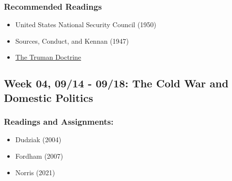 \documentclass[
  letterpaper,
  DIV=11,
  numbers=noendperiod]{scrartcl}
\providecommand{\tightlist}{%
  \setlength{\itemsep}{0pt}\setlength{\parskip}{0pt}}
\begin{document}
\subsubsection{Recommended Readings}\label{recommended-readings}

\begin{itemize}
\tightlist
\item
  United States National Security Council (1950)
\item
  Sources, Conduct, and Kennan (1947)
\item
  \href{https://www.archives.gov/milestone-documents/truman-doctrine}{The
  Truman Doctrine}
\end{itemize}

\subsection{Week 04, 09/14 - 09/18: The Cold War and Domestic
Politics}\label{week-04-0914---0918-the-cold-war-and-domestic-politics}

\subsubsection{Readings and
Assignments:}\label{readings-and-assignments-3}

\begin{itemize}
\tightlist
\item
  Dudziak (2004)
\item
  Fordham (2007)
\end{itemize}

\begin{tcolorbox}[enhanced jigsaw, arc=.35mm, bottomrule=.15mm, bottomtitle=1mm, breakable, colback=white, colbacktitle=quarto-callout-important-color!10!white, colframe=quarto-callout-important-color-frame, coltitle=black, left=2mm, leftrule=.75mm, opacityback=0, opacitybacktitle=0.6, rightrule=.15mm, title=\textcolor{quarto-callout-important-color}{\faExclamation}\hspace{0.5em}{Friday 09/18: Discussion Day}, titlerule=0mm, toprule=.15mm, toptitle=1mm]

\begin{itemize}
\tightlist
\item
  Norris (2021)
\end{itemize}

\end{tcolorbox}
\end{document}
